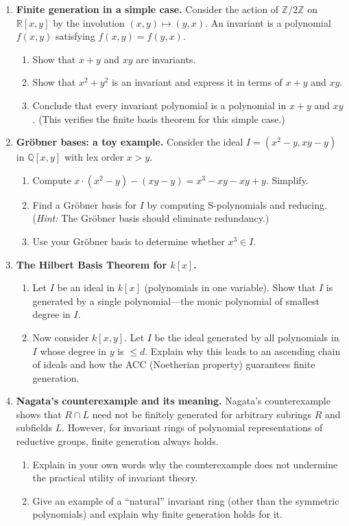 \begin{enumerate}
    \item \textbf{Finite generation in a simple case.} Consider the action of $\mathbb{Z}/2\mathbb{Z}$ on $\mathbb{R}[x,y]$ by the involution $(x,y) \mapsto (y,x)$. An invariant is a polynomial $f(x,y)$ satisfying $f(x,y) = f(y,x)$.
    \begin{enumerate}
        \item Show that $x + y$ and $xy$ are invariants.
        \item Show that $x^2 + y^2$ is an invariant and express it in terms of $x+y$ and $xy$.
        \item Conclude that every invariant polynomial is a polynomial in $x+y$ and $xy$. (This verifies the finite basis theorem for this simple case.)
    \end{enumerate}

    \item \textbf{Gr\"obner bases: a toy example.} Consider the ideal $I = (x^2 - y, xy - y)$ in $\mathbb{Q}[x,y]$ with lex order $x > y$.
    \begin{enumerate}
        \item Compute $x \cdot (x^2 - y) - (xy - y) = x^3 - xy - xy + y$. Simplify.
        \item Find a Gr\"obner basis for $I$ by computing S-polynomials and reducing. (\emph{Hint:} The Gr\"obner basis should eliminate redundancy.)
        \item Use your Gr\"obner basis to determine whether $x^3 \in I$.
    \end{enumerate}

    \item[$\star$] \textbf{The Hilbert Basis Theorem for $k[x]$.}
    \begin{enumerate}
        \item Let $I$ be an ideal in $k[x]$ (polynomials in one variable). Show that $I$ is generated by a single polynomial---the monic polynomial of smallest degree in $I$.
        \item Now consider $k[x,y]$. Let $I$ be the ideal generated by all polynomials in $I$ whose degree in $y$ is $\leq d$. Explain why this leads to an ascending chain of ideals and how the ACC (Noetherian property) guarantees finite generation.
    \end{enumerate}

    \item[$\star$] \textbf{Nagata's counterexample and its meaning.} Nagata's counterexample shows that $R \cap L$ need not be finitely generated for arbitrary subrings $R$ and subfields $L$. However, for invariant rings of polynomial representations of reductive groups, finite generation always holds.
    \begin{enumerate}
        \item Explain in your own words why the counterexample does not undermine the practical utility of invariant theory.
        \item Give an example of a ``natural'' invariant ring (other than the symmetric polynomials) and explain why finite generation holds for it.
    \end{enumerate}

\end{enumerate}

